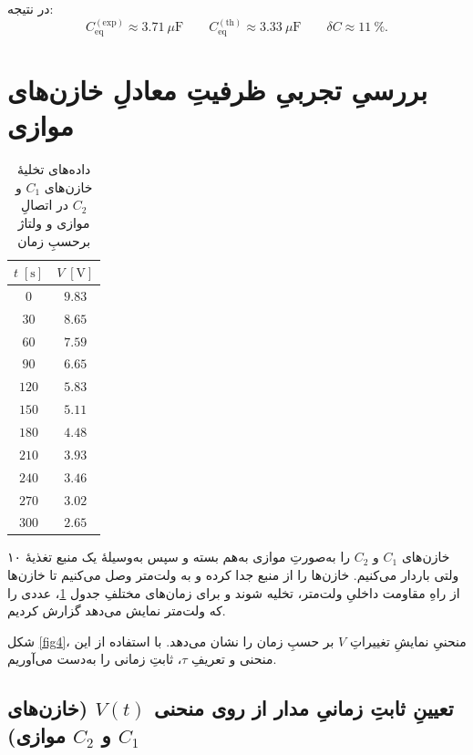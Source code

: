 \documentclass[a4paper, 11pt]{article}
\begin{document}
در نتیجه:
\begin{equation}
\boxed{C_{\mathrm{eq}}^{(\mathrm{exp})} \approx 3.71~\mu\mathrm{F}}
\qquad
\boxed{C_{\mathrm{eq}}^{(\mathrm{th})} \approx 3.33~\mu\mathrm{F}}
\qquad
\boxed{\delta C \approx 11~\%}.
\end{equation}



\section{بررسیِ تجربیِ ظرفیتِ معادلِ خازن‌های موازی}

\begin{table}

\caption{داده‌های تخلیهٔ خازن‌های \(C_1\) و \(C_2\) در اتصالِ موازی و ولتاژ برحسبِ زمان}
\label{tab4}
\centering
\begin{tabular}{cc}
\hline
$t \;[\mathrm{s}]$ & $V \;[\mathrm{V}]$ \\
\hline
  $0$ & $9.83$ \\
 $30$ & $8.65$ \\
 $60$ & $7.59$ \\
 $90$ & $6.65$ \\
$120$ & $5.83$ \\
$150$ & $5.11$ \\
$180$ & $4.48$ \\
$210$ & $3.93$ \\
$240$ & $3.46$ \\
$270$ & $3.02$ \\
$300$ & $2.65$ \\
\hline
\end{tabular}
\end{table}

خازن‌های $C_1$ و $C_2$ را به‌صورتِ موازی به‌هم بسته و سپس به‌وسیلهٔ یک منبع تغذیهٔ ۱۰ ولتی باردار می‌کنیم. خازن‌ها را از منبع جدا کرده و به ولت‌متر وصل می‌کنیم تا خازن‌ها از راهِ مقاومت داخلیِ ولت‌متر، تخلیه شوند و برای زمان‌های مختلفِ جدول \ref{tab4}، عددی را که ولت‌متر نمایش می‌دهد گزارش کردیم.



شکل \ref{fig4}، منحنیِ نمایشِ تغییراتِ $V$ بر حسبِ زمان را نشان می‌دهد. با استفاده از این منحنی و تعریفِ $\tau$، ثابتِ زمانی را به‌دست می‌آوریم.


\subsection*{تعیینِ ثابتِ زمانیِ مدار از روی منحنی $V(t)$ (خازن‌های $C_1$ و $C_2$ موازی)}
\end{document}
